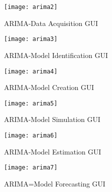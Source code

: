 
\begin{figure}[H]
\centering
\texttt{[image: arima2]}
\caption{ARIMA-Data Acquisition GUI}
\label{figApp3_1} %
\end{figure}

\begin{figure}[H]
\centering
\texttt{[image: arima3]}
\caption{ARIMA-Model Identification GUI}
\label{figApp3_2} %
\end{figure}

\begin{figure}[H]
\centering
\texttt{[image: arima4]}
\caption{ARIMA-Model Creation GUI}
\label{figApp3_3} %
\end{figure}

\begin{figure}[H]
\centering
\texttt{[image: arima5]}
\caption{ARIMA-Model Simulation GUI}
\label{figApp3_4} %
\end{figure}

\begin{figure}[H]
\centering
\texttt{[image: arima6]}
\caption{ARIMA-Model Estimation GUI}
\label{figApp3_5} %
\end{figure}

\begin{figure}[H]
\centering
\texttt{[image: arima7]}
\caption{ARIMA=Model Forecasting GUI}
\label{figApp3_6} %
\end{figure}